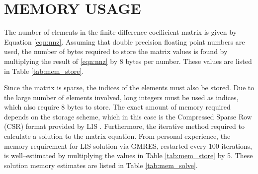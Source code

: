\chapter{MEMORY USAGE}
\label{chap:memory_usage}

The number of elements in the finite difference coefficient matrix is given by Equation \eqref{eqn:nnz}.
Assuming that double precision floating point numbers are used, the number of bytes required to store the matrix values is found by multiplying the result of \eqref{eqn:nnz} by 8 bytes per number.
These values are listed in Table \ref{tab:mem_store}.

Since the matrix is sparse, the indices of the elements must also be stored.
Due to the large number of elements involved, long integers must be used as indices, which also require 8 bytes to store.
The exact amount of memory required depends on the storage scheme, which in this case is the Compressed Sparse Row (CSR) format provided by LIS \cite{nishida_experience_2010}.
Furthermore, the iterative method required to calculate a solution to the matrix equation.
From personal experience, the memory requirement for LIS solution via GMRES, restarted every 100 iterations, is well--estimated by multiplying the values in Table \ref{tab:mem_store} by 5.
These solution memory estimates are listed in Table \ref{tab:mem_solve}.

